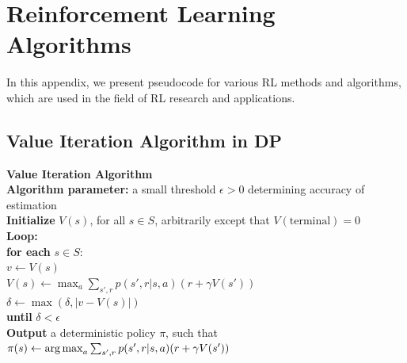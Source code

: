 \documentclass[../xlapes02]{subfiles}
\begin{document}
    \chapter{Reinforcement Learning Algorithms}\label{ch:reinforcement-learning-algorithms}
    In this appendix, we present pseudocode for various RL methods and algorithms, which are used in the field of RL research and applications.


    \section{Value Iteration Algorithm in DP}\label{sec:value-iteration-algorithm-in-dp}
    \begin{algorithm}[H]
        \label{alg:value-iteration}
        \SetAlgoLined
        \textbf{Value Iteration Algorithm}\\
        \textbf{Algorithm parameter:} a small threshold $\epsilon > 0$ determining accuracy of estimation\\
        \textbf{Initialize} $V(s)$, for all $s \in S$, arbitrarily except that $V(\text{terminal}) = 0$\\
        \textbf{Loop:}\\
        \quad \textbf{for each} $s \in S:$\\
        \quad \quad $v \leftarrow V(s)$\\
        \quad \quad $V(s) \leftarrow \max_a \sum_{s', r} p(s', r|s, a)(r + \gamma V(s'))$\\
        \quad \quad $\delta \leftarrow \max(\delta, |v - V(s)|)$\\
        \textbf{until} $\delta < \epsilon$\\
        \textbf{Output} a deterministic policy $\pi$, such that\\
        $\pi(s) \leftarrow \operatorname*{arg\,max}_a \sum_{s', r} p(s', r|s, a)(r + \gamma V(s'))$\\
    \end{algorithm}
\end{document}
